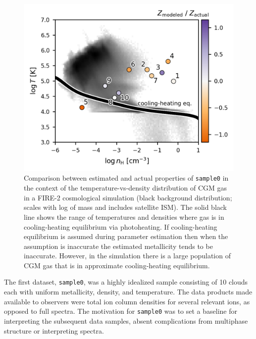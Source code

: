 \documentclass[fleqn,usenatbib]{mnras}
\begin{document}
\begin{figure}
    \centering
    \includegraphics[width=\columnwidth]{figures/sample0/phase_space.png}
    \caption{
    Comparison between estimated and actual properties of \texttt{sample0} in the context of the temperature-vs-density distribution of CGM gas in a FIRE-2 cosmological simulation (black background distribution; scales with log of mass and includes satellite ISM).
    The solid black line shows the range of temperatures and densities where gas is in cooling-heating equilibrium via photoheating.
    If cooling-heating equilibrium is assumed during parameter estimation then when the assumption is inaccurate the estimated metallicity tends to be inaccurate.
    However, in the simulation there is a large population of CGM gas that is in approximate cooling-heating equilibrium.
    }
    \label{f: idealized explanation}
\end{figure}
 
The first dataset, \texttt{sample0}, was a highly idealized sample consisting of 10 clouds each with uniform metallicity, density, and temperature.
The data products made available to observers were total  ion column densities for several relevant ions, as opposed to full spectra.
The motivation for \texttt{sample0} was to set a baseline for interpreting the subsequent data samples, absent complications from multiphase structure or interpreting spectra.
\end{document}
